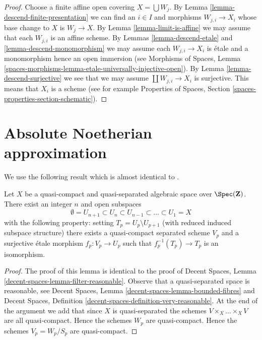 \begin{proof}
Choose a finite affine open covering $X = \bigcup W_j$.
By Lemma \ref{lemma-descend-finite-presentation}
we can find an $i \in I$ and morphisms $W_{j, i} \to X_i$
whose base change to $X$ is $W_j \to X$. By
Lemma \ref{lemma-limit-is-affine} we may assume that
each $W_{j, i}$ is an affine scheme. By
Lemmas \ref{lemma-descend-etale} and \ref{lemma-descend-monomorphism}
we may assume each $W_{j, i} \to X_i$ is \'etale and a monomorphism
hence an open immersion (see
Morphisms of Spaces, Lemma
\ref{spaces-morphisms-lemma-etale-universally-injective-open}).
By Lemma \ref{lemma-descend-surjective} we see that we may assume
$\coprod W_{j, i} \to X_i$ is surjective. This means that $X_i$
is a scheme (see for example
Properties of Spaces, Section \ref{spaces-properties-section-schematic}).
\end{proof}









\section{Absolute Noetherian approximation}
\label{section-approximation}

\noindent
We use the following result which is almost identical to
\cite[Proposition 5.7.8]{GruRay}.

\begin{lemma}
\label{lemma-filter-quasi-compact-quasi-separated}
Let $X$ be a quasi-compact and quasi-separated algebraic space over
$\Spec(\mathbf{Z})$. There exist an integer $n$ and open subspaces
$$
\emptyset = U_{n + 1} \subset
U_n \subset U_{n - 1} \subset \ldots \subset U_1 = X
$$
with the following property: setting $T_p = U_p \setminus U_{p + 1}$
(with reduced induced subspace structure) there exists a quasi-compact
separated scheme $V_p$ and a surjective \'etale morphism $f_p : V_p \to U_p$
such that $f_p^{-1}(T_p) \to T_p$ is an isomorphism.
\end{lemma}

\begin{proof}
The proof of this lemma is identical to the proof of
Decent Spaces, Lemma \ref{decent-spaces-lemma-filter-reasonable}.
Observe that a quasi-separated space is reasonable, see
Decent Spaces, Lemma \ref{decent-spaces-lemma-bounded-fibres} and
Decent Spaces, Definition \ref{decent-spaces-definition-very-reasonable}.
At the end of the argument we add that since $X$ is quasi-separated
the schemes $V \times_X \ldots \times_X V$ are all quasi-compact.
Hence the schemes $W_p$ are quasi-compact. Hence the schemes
$V_p = W_p/S_p$ are quasi-compact.
\end{proof}

